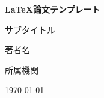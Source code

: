 \begin{titlepage}
    \centering
    \vspace*{2cm}

    {\Huge\textbf{LaTeX論文テンプレート}}

    \vspace{1cm}

    {\Large サブタイトル}

    \vspace{2cm}

    {\large 著者名}

    \vspace{1cm}

    {\large 所属機関}

    \vfill

    {\large \today}

\end{titlepage}

\cleardoublepage
